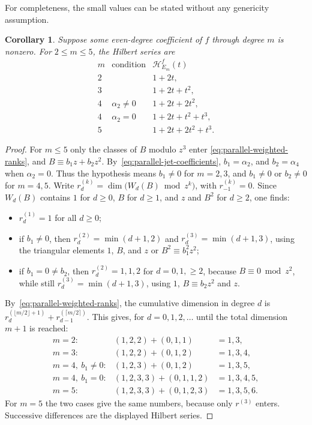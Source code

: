 \documentclass[reqno]{article}
\theoremstyle{plain} %
\newtheorem{corollary}[theorem]{Corollary}
\theoremstyle{definition}
\theoremstyle{remark}
\newcommand{\hs}{\mathscr{H}}
\numberwithin{equation}{section}
\begin{document}
For completeness, the small values can be stated without any genericity
assumption.
\begin{corollary}\label{cor:small-parallel}
Suppose some even-degree coefficient of $f$ through degree $m$ is nonzero. For
$2\le m\le5$, the Hilbert series are
\[
\begin{array}{ccl}
 m&\text{condition}&\hs_{E_m}^f(t)\\ \hline
 2& &1+2t,\\
 3& &1+2t+t^2,\\
 4&\alpha_2\ne0&1+2t+2t^2,\\
 4&\alpha_2=0&1+2t+t^2+t^3,\\
 5& &1+2t+2t^2+t^3.
\end{array}
\]
\end{corollary}
\begin{proof}
For $m\le5$ only the classes of $B$ modulo $z^3$ enter
\eqref{eq:parallel-weighted-ranks}, and $B\equiv b_1z+b_2z^2$.
By~\eqref{eq:parallel-jet-coefficients}, $b_1=\alpha_2$, and
$b_2=\alpha_4$ when $\alpha_2=0$. Thus the hypothesis means $b_1\ne0$
for $m=2,3$, and $b_1\ne0$ or $b_2\ne0$ for $m=4,5$.
Write $r_d^{(k)}=\dim\bigl(W_d(B)\bmod z^k\bigr)$, with $r_{-1}^{(k)}=0$.
Since $W_d(B)$ contains $1$ for $d\ge0$, $B$ for $d\ge1$, and
$z$ and $B^2$ for $d\ge2$, one finds:
\begin{itemize}
\item $r_d^{(1)}=1$ for all $d\ge0$;
\item if $b_1\ne0$, then $r_d^{(2)}=\min(d+1,2)$ and
 $r_d^{(3)}=\min(d+1,3)$, using the triangular elements $1$, $B$, and
 $z$ or $B^2\equiv b_1^2z^2$;
\item if $b_1=0\ne b_2$, then $r_d^{(2)}=1,1,2$ for $d=0,1,\ge2$,
 because $B\equiv0\bmod z^2$, while still $r_d^{(3)}=\min(d+1,3)$,
 using $1$, $B\equiv b_2z^2$ and $z$.
\end{itemize}
By~\eqref{eq:parallel-weighted-ranks}, the cumulative dimension in
degree $d$ is
$r_d^{(\lfloor m/2\rfloor+1)}+r_{d-1}^{(\lceil m/2\rceil)}$. This gives,
for $d=0,1,2,\ldots$ until the total dimension $m+1$ is reached:
\[
\begin{array}{lll}
m=2:&(1,2,2)+(0,1,1)&=1,3,\\
m=3:&(1,2,2)+(0,1,2)&=1,3,4,\\
m=4,\ b_1\ne0:&(1,2,3)+(0,1,2)&=1,3,5,\\
m=4,\ b_1=0:&(1,2,3,3)+(0,1,1,2)&=1,3,4,5,\\
m=5:&(1,2,3,3)+(0,1,2,3)&=1,3,5,6.
\end{array}
\]
For $m=5$ the two cases give the same numbers, because only
$r^{(3)}$ enters. Successive differences are the displayed Hilbert series.
\end{proof}
\end{document}
